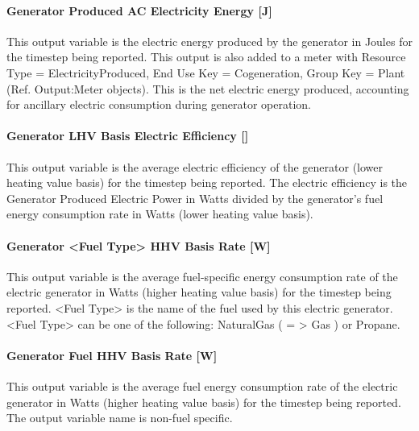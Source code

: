 \paragraph{Generator Produced AC Electricity Energy {[}J{]}}\label{generator-produced-electric-energy-j-1}

This output variable is the electric energy produced by the generator in Joules for the timestep being reported. This output is also added to a meter with Resource Type = ElectricityProduced, End Use Key = Cogeneration, Group Key = Plant (Ref. Output:Meter objects). This is the net electric energy produced, accounting for ancillary electric consumption during generator operation.

\paragraph{Generator LHV Basis Electric Efficiency {[]}}\label{generator-lhv-basis-electric-efficiency}

This output variable is the average electric efficiency of the generator (lower heating value basis) for the timestep being reported. The electric efficiency is the Generator Produced Electric Power in Watts divided by the generator's fuel energy consumption rate in Watts (lower heating value basis).

\paragraph{Generator \textless{}Fuel Type\textgreater{} HHV Basis Rate {[}W{]}}\label{generator-fuel-type-hhv-basis-rate-w}

This output variable is the average fuel-specific energy consumption rate of the electric generator in Watts (higher heating value basis) for the timestep being reported. \textless{}Fuel Type\textgreater{} is the name of the fuel used by this electric generator. \textless{}Fuel Type\textgreater{} can be one of the following: NaturalGas ( = \textgreater{} Gas ) or Propane.

\paragraph{Generator Fuel HHV Basis Rate {[}W{]}}\label{generator-fuel-hhv-basis-rate-w-1}

This output variable is the average fuel energy consumption rate of the electric generator in Watts (higher heating value basis) for the timestep being reported. The output variable name is non-fuel specific.

